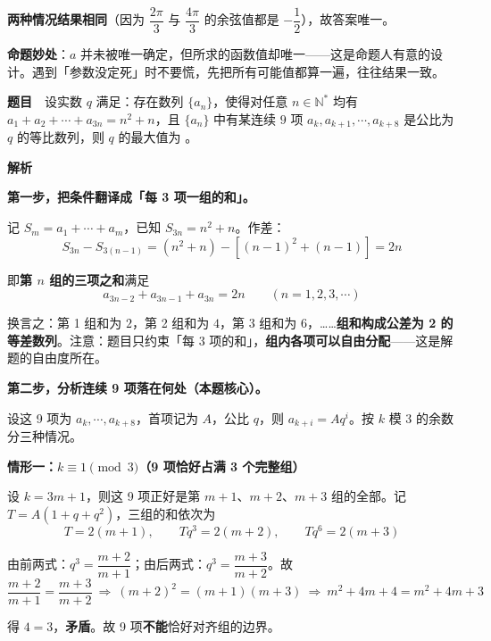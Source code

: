 \textbf{两种情况结果相同}（因为 $\dfrac{2\pi}{3}$ 与 $\dfrac{4\pi}{3}$ 的余弦值都是 $-\dfrac12$），故答案唯一。


\begin{gktip}
\textbf{命题妙处}：$a$ 并未被唯一确定，但所求的函数值却唯一——这是命题人有意的设计。遇到「参数没定死」时不要慌，先把所有可能值都算一遍，往往结果一致。
\end{gktip}

\par\medskip


\textbf{题目}　设实数 $q$ 满足：存在数列 $\{a_n\}$，使得对任意 $n\in\mathbb{N}^*$ 均有 $a_1+a_2+\cdots+a_{3n}=n^2+n$，且 $\{a_n\}$ 中有某连续 $9$ 项 $a_k,a_{k+1},\cdots,a_{k+8}$ 是公比为 $q$ 的等比数列，则 $q$ 的最大值为 \gkblank{}。

\textbf{解析}

\textbf{第一步，把条件翻译成「每 3 项一组的和」。}

记 $S_m=a_1+\cdots+a_m$，已知 $S_{3n}=n^2+n$。作差：
\[S_{3n}-S_{3(n-1)}=\left(n^2+n\right)-\left[(n-1)^2+(n-1)\right]=2n\]

即\textbf{第 $n$ 组的三项之和}满足
\[a_{3n-2}+a_{3n-1}+a_{3n}=2n\qquad(n=1,2,3,\cdots)\]

换言之：第 1 组和为 $2$，第 2 组和为 $4$，第 3 组和为 $6$，……\textbf{组和构成公差为 2 的等差数列}。注意：题目只约束「每 3 项的和」，\textbf{组内各项可以自由分配}——这是解题的自由度所在。

\textbf{第二步，分析连续 9 项落在何处（本题核心）。}

设这 9 项为 $a_k,\cdots,a_{k+8}$，首项记为 $A$，公比 $q$，则 $a_{k+i}=Aq^{i}$。按 $k$ 模 $3$ 的余数分三种情况。

\par\medskip

\textbf{情形一：$k\equiv1\pmod 3$（9 项恰好占满 3 个完整组）}

设 $k=3m+1$，则这 9 项正好是第 $m+1$、$m+2$、$m+3$ 组的全部。记 $T=A\left(1+q+q^2\right)$，三组的和依次为
\[T=2(m+1),\qquad Tq^3=2(m+2),\qquad Tq^{6}=2(m+3)\]

由前两式：$q^3=\dfrac{m+2}{m+1}$；由后两式：$q^3=\dfrac{m+3}{m+2}$。故
\[\frac{m+2}{m+1}=\frac{m+3}{m+2}\ \Longrightarrow\ (m+2)^2=(m+1)(m+3)\ \Longrightarrow\ m^2+4m+4=m^2+4m+3\]

得 $4=3$，\textbf{矛盾}。故 9 项\textbf{不能}恰好对齐组的边界。

